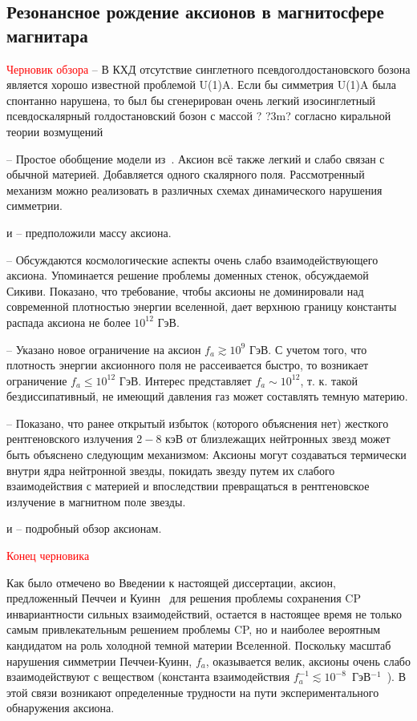 \subsection{Резонансное рождение аксионов в магнитосфере магнитара}
\textcolor{red}{Черновик обзора}
\cite{Weinberg:1975} -- В КХД отсутствие синглетного псевдоголдостановского бозона является хорошо известной проблемой U(1)A. Если бы симметрия U(1)A была спонтанно нарушена, то был бы сгенерирован очень легкий изосинглетный псевдоскалярный голдостановский бозон с массой ? ?3m? согласно киральной теории возмущений

\cite{Dine:1981} -- Простое обобщение модели из~\cite{Quinn:1977}. Аксион всё также легкий и слабо связан с обычной материей. Добавляется одного скалярного поля. Рассмотренный механизм можно реализовать в различных схемах динамического нарушения симметрии.

\cite{Weinberg:1978} и \cite{Wilczek:1978} -- предположили массу аксиона.

\cite{Dine:1983} -- Обсуждаются космологические аспекты очень слабо взаимодействующего аксиона. Упоминается решение проблемы доменных стенок, обсуждаемой Сикиви. Показано, что требование, чтобы аксионы не доминировали над современной плотностью энергии вселенной, дает верхнюю границу константы распада аксиона не более $10^{12}$ ГэВ.

\cite{Preskill:1983} -- Указано новое ограничение на аксион $f_a\gtrsim 10^9$ ГэВ. С учетом того, что плотность энергии аксионного поля не рассеивается быстро, то возникает ограничение $f_a\leqslant10^{12}$ ГэВ. Интерес представляет $f_a\sim 10^{12}$, т. к. такой бездиссипативный, не имеющий давления газ может составлять темную материю.

\cite{Buschmann:2021} -- Показано, что ранее открытый избыток (которого объяснения нет) жесткого рентгеновского излучения $2-8$ кэВ от близлежащих нейтронных звезд может быть объяснено следующим механизмом: Аксионы могут создаваться термически внутри ядра нейтронной звезды, покидать звезду путем их слабого взаимодействия с материей и впоследствии превращаться в рентгеновское излучение в магнитном поле звезды.

\cite{Kim:2010} и \cite{Marsh:2016} -- подробный обзор аксионам.


\textcolor{red}{Конец черновика}

Как было отмечено во Введении к настоящей диссертации, аксион, предложенный Печчеи  и Куинн~\cite{Quinn:1977} для 
решения проблемы сохранения CP инвариантности 
сильных взаимодействий, остается в настоящее время не только самым привлекательным 
решением проблемы CP, но и наиболее вероятным кандидатом на роль холодной темной
материи Вселенной. Поскольку масштаб нарушения симметрии Печчеи-Куинн, $f_a$,
оказывается велик, аксионы очень слабо взаимодействуют с веществом
(константа взаимодействия $f_a^{-1} \lesssim 10^{-8}$\, ГэВ$^{-1}$~\cite{Raffelt:1996}). 
В этой связи возникают определенные трудности
на пути экспериментального обнаружения аксиона.


